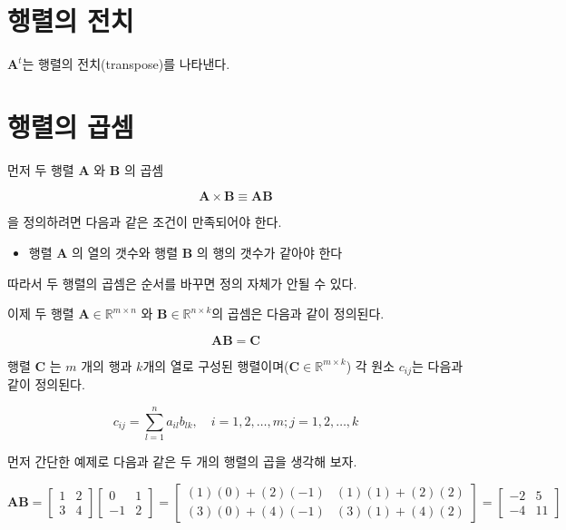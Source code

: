 \documentclass[
  11pt,
  a4paper,
  oneside]{scrbook}
\providecommand{\tightlist}{%
  \setlength{\itemsep}{0pt}\setlength{\parskip}{0pt}}\usepackage{longtable,booktabs,array}
\newcommand{\RR}{\mathbb{R}}
\theoremstyle{definition}
\theoremstyle{plain}
\theoremstyle{definition}
\theoremstyle{definition}
\theoremstyle{remark}
\begin{document}
\section{행렬의 전치}\label{uxd589uxb82cuxc758-uxc804uxce58}

\(\pmb A^t\)는 행렬의 전치(transpose)를 나타낸다.

\section{행렬의 곱셈}\label{uxd589uxb82cuxc758-uxacf1uxc148}

먼저 두 행렬 \(\pmb A\) 와 \(\pmb B\) 의 곱셈

\[ \pmb A \times \pmb B \equiv \pmb A \pmb B \]

을 정의하려면 다음과 같은 조건이 만족되어야 한다.

\begin{itemize}
\tightlist
\item
  행렬 \(\pmb A\) 의 열의 갯수와 행렬 \(\pmb B\) 의 행의 갯수가 같아야
  한다
\end{itemize}

따라서 두 행렬의 곱셈은 순서를 바꾸면 정의 자체가 안될 수 있다.

이제 두 행렬 \(\pmb A \in \RR^{m \times n}\) 와
\(\pmb B \in \RR^{n \times k}\)의 곱셈은 다음과 같이 정의된다.

\[ \pmb A \pmb B =  \pmb C\]

행렬 \(\pmb C\) 는 \(m\) 개의 행과 \(k\)개의 열로 구성된
행렬이며(\(\pmb C \in \RR^{m \times k}\)) 각 원소 \(c_{ij}\)는 다음과
같이 정의된다.

\[  c_{ij} = \sum_{l=1}^n a_{il} b_{lk}, \quad i=1,2,\dots,m; j=1,2,\dots,k \]

먼저 간단한 예제로 다음과 같은 두 개의 행렬의 곱을 생각해 보자.

\[
\pmb A \pmb B =
\begin{bmatrix}
1 & 2 \\
3 & 4 
\end{bmatrix}
\begin{bmatrix}
0 & 1 \\
-1 & 2
\end{bmatrix}
=
\begin{bmatrix}
(1)(0) + (2)(-1) & (1)(1) + (2)(2) \\
(3)(0) + (4)(-1) & (3)(1) + (4)(2)
\end{bmatrix}
=
\begin{bmatrix}
-2 & 5 \\
-4 & 11
\end{bmatrix}
\]
\end{document}
